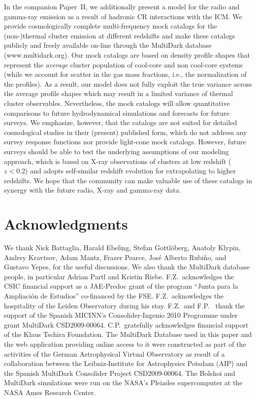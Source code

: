 \documentclass[useAMS,usenatbib]{mn2e}
\begin{document}
{  In the companion Paper~II, we additionally present a model for the radio and
  gamma-ray emission as a result of hadronic CR interactions with the ICM.  We
  provide cosmologically complete multi-frequency mock catalogs for the
  \mbox{(non-)thermal} cluster emission at different redshifts and make these
  catalogs publicly and freely available on-line through the MultiDark database
  (www.multidark.org). Our mock catalogs are based on density profile shapes
  that represent the {\em average} cluster population of cool-core and non
  cool-core systems (while we account for scatter in the gas mass fractions,
  i.e., the normalization of the profiles). As a result, our model does not
  fully exploit the true variance across the average profile shapes which may
  result in a limited variance of thermal cluster observables. Nevertheless, the
  mock catalogs will allow quantitative comparisons to future hydrodynamical
  simulations and forecasts for future surveys.  We emphasize, however, that the
  catalogs are not suited for detailed cosmological studies in their (present)
  published form, which do not address any survey response functions nor provide
  light-cone mock catalogs. However, future surveys should be able to test the
  underlying assumptions of our modeling approach, which is based on X-ray
  observations of clusters at low redshift ($z<0.2$) and adopts self-similar
  redshift evolution for extrapolating to higher redshifts. We hope that the
  community can make valuable use of these catalogs in synergy with the future
  radio, X-ray and gamma-ray data.}



\section*{Acknowledgments}
We thank Nick Battaglia, Harald Ebeling, Stefan Gottl{\"o}berg, Anatoly Klypin,
Andrey Kravtsov, Adam Mantz, Frazer Pearce, Jos\'e Alberto Rubi\~no, and Gustavo
Yepes, for the useful discussions. We also thank the MultiDark database people,
in particular Adrian Partl and Kristin Riebe.  F.Z.{\ }acknowledges the CSIC
financial support as a JAE-Predoc grant of the program ``Junta para la
Ampliaci\'on de Estudios'' co-financed by the FSE.  F.Z.{\ }acknowledges the
hospitality of the Leiden Observatory during his stay.  F.Z.{\ }and F.P.{\ }
thank the support of the Spanish MICINN's Consolider-Ingenio 2010 Programme
under grant MultiDark CSD2009-00064. C.P.{\ }gratefully acknowledges financial
support of the Klaus Tschira Foundation. The MultiDark Database used in this
paper and the web application providing online access to it were constructed as
part of the activities of the German Astrophysical Virtual Observatory as result
of a collaboration between the Leibniz-Institute for Astrophysics Potsdam (AIP)
and the Spanish MultiDark Consolider Project CSD2009-00064. The Bolshoi and
MultiDark simulations were run on the NASA's Pleiades supercomputer at the NASA
Ames Research Center.
\end{document}
